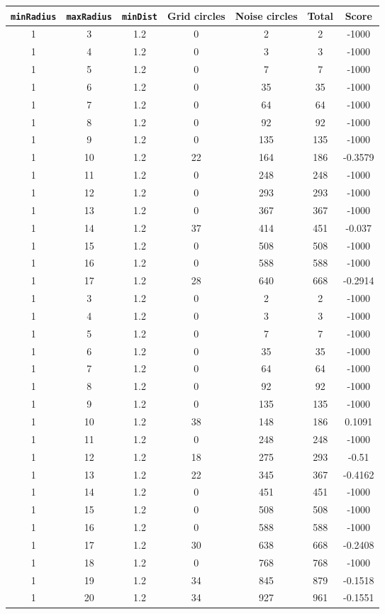 \documentclass[letterpaper, 12pt]{article}
\begin{document}
\begin{longtable}{|c|c|c|c|c|c|c|}
\hline
\textbf{\texttt{minRadius}} & \textbf{\texttt{maxRadius}} & \textbf{\texttt{minDist}} & \textbf{Grid circles} & \textbf{Noise circles} & \textbf{Total} & \textbf{Score} \\
\hline
1 & 3 & 1.2 & 0 & 2 & 2 & -1000 \\
\hline
1 & 4 & 1.2 & 0 & 3 & 3 & -1000 \\
\hline
1 & 5 & 1.2 & 0 & 7 & 7 & -1000 \\
\hline
1 & 6 & 1.2 & 0 & 35 & 35 & -1000 \\
\hline
1 & 7 & 1.2 & 0 & 64 & 64 & -1000 \\
\hline
1 & 8 & 1.2 & 0 & 92 & 92 & -1000 \\
\hline
1 & 9 & 1.2 & 0 & 135 & 135 & -1000 \\
\hline
1 & 10 & 1.2 & 22 & 164 & 186 & -0.3579 \\
\hline
1 & 11 & 1.2 & 0 & 248 & 248 & -1000 \\
\hline
1 & 12 & 1.2 & 0 & 293 & 293 & -1000 \\
\hline
1 & 13 & 1.2 & 0 & 367 & 367 & -1000 \\
\hline
1 & 14 & 1.2 & 37 & 414 & 451 & -0.037 \\
\hline
1 & 15 & 1.2 & 0 & 508 & 508 & -1000 \\
\hline
1 & 16 & 1.2 & 0 & 588 & 588 & -1000 \\
\hline
1 & 17 & 1.2 & 28 & 640 & 668 & -0.2914 \\
\hline
1 & 3 & 1.2 & 0 & 2 & 2 & -1000 \\
\hline
1 & 4 & 1.2 & 0 & 3 & 3 & -1000 \\
\hline
1 & 5 & 1.2 & 0 & 7 & 7 & -1000 \\
\hline
1 & 6 & 1.2 & 0 & 35 & 35 & -1000 \\
\hline
1 & 7 & 1.2 & 0 & 64 & 64 & -1000 \\
\hline
1 & 8 & 1.2 & 0 & 92 & 92 & -1000 \\
\hline
1 & 9 & 1.2 & 0 & 135 & 135 & -1000 \\
\hline
1 & 10 & 1.2 & 38 & 148 & 186 & 0.1091 \\
\hline
1 & 11 & 1.2 & 0 & 248 & 248 & -1000 \\
\hline
1 & 12 & 1.2 & 18 & 275 & 293 & -0.51 \\
\hline
1 & 13 & 1.2 & 22 & 345 & 367 & -0.4162 \\
\hline
1 & 14 & 1.2 & 0 & 451 & 451 & -1000 \\
\hline
1 & 15 & 1.2 & 0 & 508 & 508 & -1000 \\
\hline
1 & 16 & 1.2 & 0 & 588 & 588 & -1000 \\
\hline
1 & 17 & 1.2 & 30 & 638 & 668 & -0.2408 \\
\hline
1 & 18 & 1.2 & 0 & 768 & 768 & -1000 \\
\hline
1 & 19 & 1.2 & 34 & 845 & 879 & -0.1518 \\
\hline
1 & 20 & 1.2 & 34 & 927 & 961 & -0.1551 \\
\hline
\end{longtable}
\end{document}
